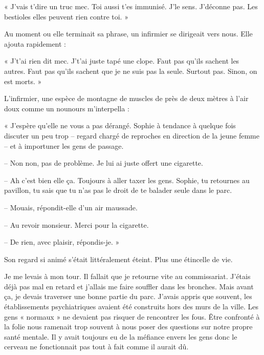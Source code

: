 « J'vais t'dire un truc mec. Toi aussi t'es immunisé. J'le sens. J'déconne pas. Les bestioles elles peuvent rien 
contre toi. »

Au moment ou elle terminait sa phrase, un infirmier se dirigeait vers nous. Elle ajouta rapidement :

« J't'ai rien dit mec. J't'ai juste tapé une clope. Faut pas qu'ils sachent les autres. Faut pas qu'ils sachent que je 
ne suis pas la seule. Surtout pas. Sinon, on est morts. »

L'infirmier, une espèce de montagne de muscles de près de deux mètres à l'air doux comme un nounours m'interpella :

« J'espère qu'elle ne vous a pas dérangé. Sophie à tendance à quelque fois discuter un peu trop -- regard chargé de 
reproches en direction de la jeune femme -- et à importuner les gens de passage.

-- Non non, pas de problème. Je lui ai juste offert une cigarette.

-- Ah c'est bien elle ça. Toujours à aller taxer les gens. Sophie, tu retournes au pavillon, tu sais que tu n'as pas le 
droit de te balader seule dans le parc.

-- Mouais, répondit-elle d'un air maussade.

-- Au revoir monsieur. Merci pour la cigarette.

-- De rien, avec plaisir, répondis-je. »

Son regard si animé s'était littéralement éteint. Plus une étincelle de vie.

Je me levais à mon tour. Il fallait que je retourne vite au commissariat. J'étais déjà pas mal en retard et 
j'allais me faire souffler dans les bronches. Mais avant ça, je devais traverser une bonne partie du parc.  J'avais 
appris que souvent, les établissements psychiatriques avaient été construits hors des murs de la ville. Les gens 
« normaux » ne devaient pas risquer de rencontrer les fous. Être confronté à la folie nous ramenait trop souvent à nous 
poser des questions sur notre propre santé mentale. Il y avait toujours eu de la méfiance envers les gens donc le 
cerveau ne fonctionnait pas tout à fait comme il aurait dû.

